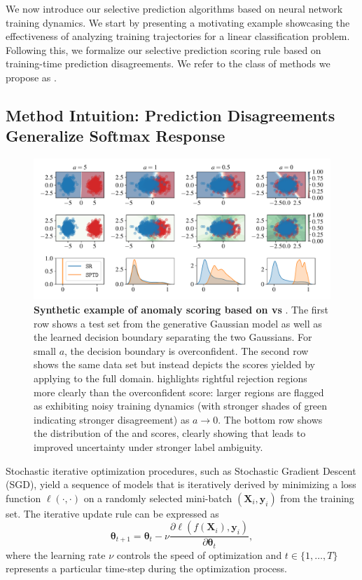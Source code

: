 We now introduce our selective prediction algorithms based on neural network training dynamics. We start by presenting a motivating example showcasing the effectiveness of analyzing training trajectories for a linear classification problem. Following this, we formalize our selective prediction scoring rule based on training-time prediction disagreements. We refer to the class of methods we propose as \sptd.

\subsection{Method Intuition: Prediction Disagreements Generalize Softmax Response}
\label{sec:method_intuition}

\begin{figure}
    \centering
    \includegraphics[width=0.97\linewidth]{figs/sptd/gaussians_anom2.pdf}
    \caption[Synthetic example of anomaly scoring based on \sr vs \sptd.]{\textbf{Synthetic example of anomaly scoring based on \sr vs \sptd}. The first row shows a test set from the generative Gaussian model as well as the learned decision boundary separating the two Gaussians. For small $a$, the decision boundary is overconfident. The second row shows the same data set but instead depicts the scores yielded by applying \sptd to the full domain. \sptd highlights rightful rejection regions more clearly than the overconfident \sr score: larger regions are flagged as exhibiting noisy training dynamics (with stronger shades of green indicating stronger disagreement) as $a \rightarrow 0$. The bottom row shows the distribution of the \sr and \sptd scores, clearly showing that \sptd leads to improved uncertainty under stronger label ambiguity.}
    \label{fig:gauss}
\end{figure}


Stochastic iterative optimization procedures, such as Stochastic Gradient Descent (SGD), yield a sequence of models that is iteratively derived by minimizing a loss function $\ell(\cdot,\cdot)$ on a randomly selected mini-batch $(\bm{X}_i, \bm{y}_i)$ from the training set. The iterative update rule can be expressed as
\begin{equation}
    \bm{\theta}_{t+1} = \bm{\theta}_{t} - \nu \frac{\partial \ell(f(\bm{X}_i), \bm{y}_i)}{\partial \bm{\theta}_{t}},
\end{equation}
where the learning rate $\nu$ controls the speed of optimization and $t \in \{1,\ldots,T\}$ represents a particular time-step during the optimization process.

